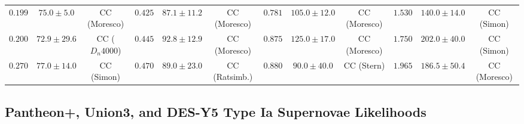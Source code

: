 \documentclass[aps,prd,preprint,superscriptaddress,nofootinbib]{revtex4-2}
\begin{document}
\begin{table}[!htbp]
{\begin{tabular}{ccc|ccc|ccc|ccc}
$0.199$ & $75.0 \pm 5.0$ & CC (Moresco) & $0.425$ & $87.1 \pm 11.2$ & CC (Moresco) & $0.781$ & $105.0 \pm 12.0$ & CC (Moresco) & $1.530$ & $140.0 \pm 14.0$ & CC (Simon) \\
$0.200$ & $72.9 \pm 29.6$ & CC ($D_n4000$) & $0.445$ & $92.8 \pm 12.9$ & CC (Moresco) & $0.875$ & $125.0 \pm 17.0$ & CC (Moresco) & $1.750$ & $202.0 \pm 40.0$ & CC (Simon) \\
$0.270$ & $77.0 \pm 14.0$ & CC (Simon) & $0.470$ & $89.0 \pm 23.0$ & CC (Ratsimb.) & $0.880$ & $90.0 \pm 40.0$ & CC (Stern) & $1.965$ & $186.5 \pm 50.4$ & CC (Moresco) \\
\bottomrule
\end{tabular}%
}
\end{table}

\subsection{Pantheon+, Union3, and DES-Y5 Type Ia Supernovae Likelihoods}
\end{document}
